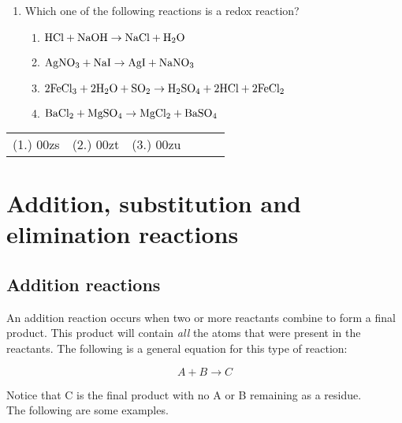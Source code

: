 {\begin{enumerate}
\item{Which one of the following reactions is a redox reaction?}
\begin{enumerate}
\item{$\rm{HCl + NaOH \rightarrow NaCl + H_{2}O}$}
\item{$\rm{AgNO_{3} + NaI \rightarrow AgI + NaNO_{3}}$}
\item{$\rm{2FeCl_{3} + 2H_{2}O + SO_{2} \rightarrow H_{2}SO_{4} + 2HCl + 2FeCl_{2}}$}
\item{$\rm{BaCl_{2} + MgSO_{4} \rightarrow MgCl_{2} + BaSO_{4}}$}
\end{enumerate}

\end{enumerate}
\practiceinfo

\begin{tabular}[h]{cccccc}
(1.) 00zs & (2.) 00zt & (3.) 00zu & 
 \end{tabular}
}






\section{Addition, substitution and elimination reactions}

\subsection{Addition reactions}

An addition reaction occurs when two or more reactants combine to form a final product. This product will contain \textit{all} the atoms that were present in the reactants. The following is a general equation for this type of reaction:

\begin{equation*}
A + B \rightarrow C
\end{equation*}

Notice that C is the final product with no A or B remaining as a residue.\\

The following are some examples.

